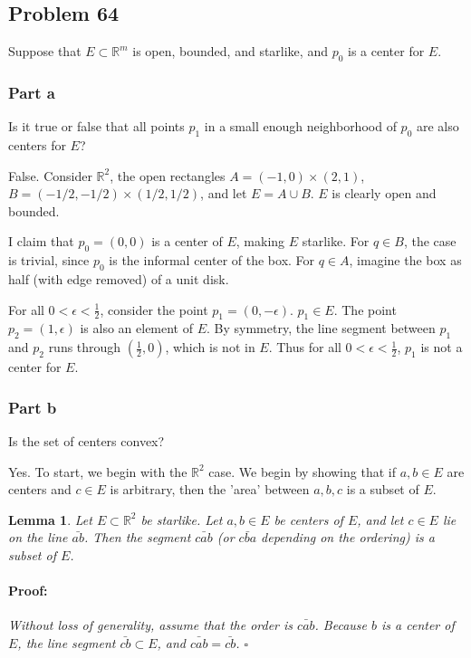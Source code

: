 \documentclass{article}
\newenvironment{proof}{\paragraph{Proof:}}{\hfill$\square$}
\newtheorem{lemma}[theorem]{Lemma}
\newcommand{\R}{\mathbb{R}}
\begin{document}
\subsection*{Problem 64}

Suppose that $E \subset \R^m$ is open, bounded, and starlike, and $p_0$ is a center for $E$.

\subsubsection*{Part a}

Is it true or false that all points $p_1$ in a small enough neighborhood of $p_0$ are also centers for $E$?

False. Consider $\R^2$, the open rectangles $A = (-1, 0) \times (2, 1)$, $B = (-1/2, -1/2) \times (1/2, 1/2)$, and let $E = A \cup B$. $E$ is clearly open and bounded.

I claim that $p_0 = (0, 0)$ is a center of $E$, making $E$ starlike. For $q \in B$, the case is trivial, since $p_0$ is the informal center of the box. For $q \in A$, imagine the box as half (with edge removed) of a unit disk.

For all $0 < \epsilon < \frac{1}{2}$, consider the point $p_1 = (0, -\epsilon)$. $p_1 \in E$. The point $p_2 = (1, \epsilon)$ is also an element of $E$. By symmetry, the line segment between $p_1$ and $p_2$ runs through $(\frac{1}{2}, 0)$, which is not in $E$. Thus for all $0 < \epsilon < \frac{1}{2}$, $p_1$ is not a center for $E$.

\subsubsection*{Part b}

Is the set of centers convex?

Yes. To start, we begin with the $\R^2$ case. We begin by showing that if $a, b \in E$ are centers and $c \in E$ is arbitrary, then the 'area' between $a, b, c$ is a subset of $E$.

\begin{lemma}
Let $E \subset \R^2$ be starlike. Let $a, b \in E$ be centers of $E$, and let $c \in E$ lie on the line $\bar{ab}$. Then the segment $\bar{cab}$ (or $\bar{cba}$ depending on the ordering) is a subset of $E$.
\begin{proof}
Without loss of generality, assume that the order is $\bar{cab}$. Because $b$ is a center of $E$, the line segment $\bar{cb} \subset E$, and $\bar{cab} = \bar{cb}$.
\end{proof}
\end{lemma}
\end{document}
